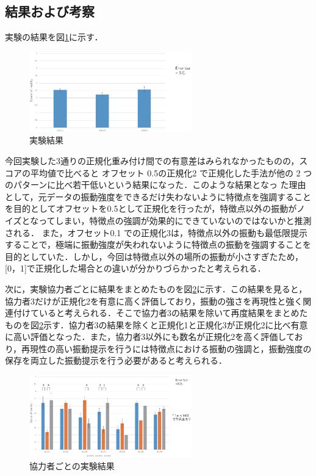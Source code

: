 \documentclass[a4paper]{jarticle}
\begin{document}
\subsection{結果および考察}
実験の結果を図\ref{fig4}に示す．

\begin{figure}[tb]
  \begin{center}
    \includegraphics*[width=70mm]{res.eps}
  \end{center}
  \vspace*{-6mm}
  \caption{実験結果}
  \label{fig4}
\end{figure}

今回実験した3通りの正規化重み付け間での有意差はみられなかったものの，スコアの平均値で比べると オフセット 0.5の正規化2 で正規化した手法が他の 2 つのパターンに比べ若干低いという結果になった．このような結果となっ た理由として，元データの振動強度をできるだけ失わないように特徴点を強調することを目的としてオフセットを0.5として正規化を行ったが，特徴点以外の振動がノイズとなってしまい，特徴点の強調が効果的にできていないのではないかと推測される．
また，オフセット0.1 での正規化3は，特徴点以外の振動も最低限提示することで，極端に振動強度が失われないように特徴点の振動を強調することを目的としていた．しかし，今回は特徴点以外の場所の振動が小さすぎたため，[0，1]で正規化した場合との違いが分かりづらかったと考えられる．

次に，実験協力者ごとに結果をまとめたものを図\ref{fig6}に示す．この結果を見ると，協力者3だけが正規化2を有意に高く評価しており，振動の強さを再現性と強く関連付けていると考えられる．そこで協力者3の結果を除いて再度結果をまとめたものを図\ref{fig6}示す．協力者3の結果を除くと正規化1と正規化3が正規化2に比べ有意に高い評価となった．また，協力者3以外にも数名が正規化2を高く評価しており，再現性の高い振動提示を行うには特徴点における振動の強調と，振動強度の保存を両立した振動提示を行う必要があると考えられる．

\begin{figure}[tb]
  \begin{center}
    \includegraphics*[width=70mm]{res2.eps}
  \end{center}
  \vspace*{-6mm}
  \caption{協力者ごとの実験結果}
  \label{fig6}
\end{figure}
\end{document}
